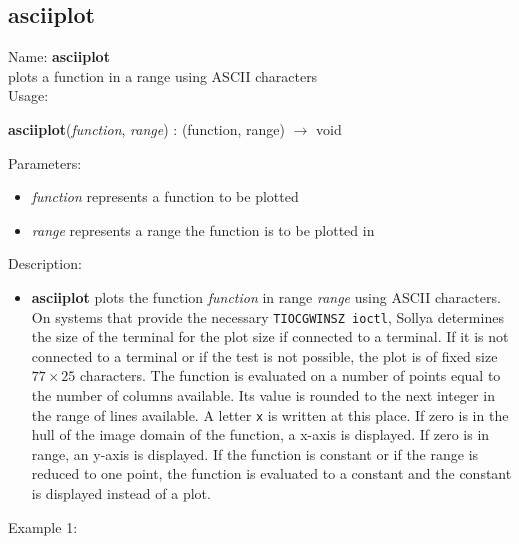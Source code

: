 \subsection{asciiplot}
\label{labasciiplot}
\noindent Name: \textbf{asciiplot}\\
plots a function in a range using ASCII characters\\

\noindent Usage: 
\begin{center}
\textbf{asciiplot}(\emph{function}, \emph{range}) : (\textsf{function}, \textsf{range}) $\rightarrow$ \textsf{void}\\
\end{center}
Parameters: 
\begin{itemize}
\item \emph{function} represents a function to be plotted
\item \emph{range} represents a range the function is to be plotted in 
\end{itemize}
\noindent Description: \begin{itemize}

\item \textbf{asciiplot} plots the function \emph{function} in range \emph{range} using ASCII
   characters.  On systems that provide the necessary 
   \texttt{TIOCGWINSZ ioctl}, Sollya determines the size of the
   terminal for the plot size if connected to a terminal. If it is not
   connected to a terminal or if the test is not possible, the plot is of
   fixed size $77\times25$ characters.  The function is
   evaluated on a number of points equal to the number of columns
   available. Its value is rounded to the next integer in the range of
   lines available. A letter \texttt{x} is written at this place. If zero is in
   the hull of the image domain of the function, a x-axis is
   displayed. If zero is in range, an y-axis is displayed.  If the
   function is constant or if the range is reduced to one point, the
   function is evaluated to a constant and the constant is displayed
   instead of a plot.
\end{itemize}
\noindent Example 1: 
